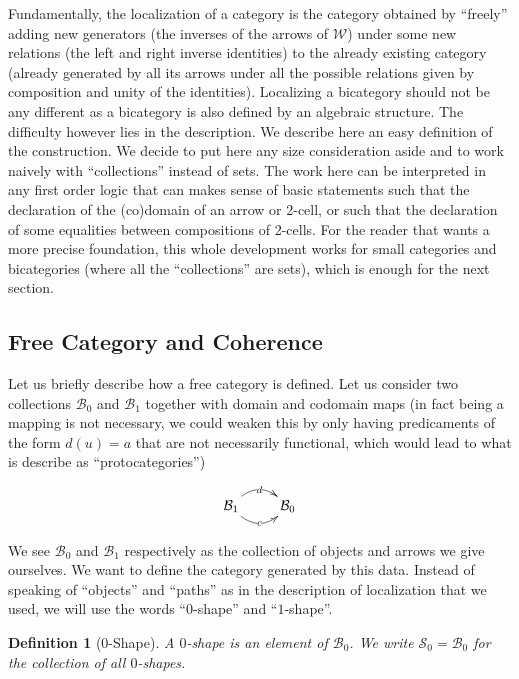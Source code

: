 \documentclass{article}
\numberwithin{equation}{section}
\theoremstyle{definition}
\theoremstyle{plain}
\newtheorem{definition}[equation]{Definition}
\begin{document}
Fundamentally, the localization of a category is the category obtained by ``freely'' adding new generators (the inverses of the arrows of $\mathcal{W}$) under some new relations (the left and right inverse identities) to the already existing category (already generated by all its arrows under all the possible relations given by composition and unity of the identities). Localizing a bicategory should not be any different as a bicategory is also defined by an algebraic structure. The difficulty however lies in the description. We describe here an easy definition of the construction. We decide to put here any size consideration aside and to work naively with ``collections'' instead of sets. The work here can be interpreted in any first order logic that can makes sense of basic statements such that the declaration of the (co)domain of an arrow or 2-cell, or such that the declaration of some equalities between compositions of 2-cells. For the reader that wants a more precise foundation, this whole development works for small categories and bicategories (where all the ``collections'' are sets), which is enough for the next section.

\subsection{Free Category and Coherence}

Let us briefly describe how a free category is defined. Let us consider two collections $\mathcal{B}_0$ and $\mathcal{B}_1$ together with domain and codomain maps (in fact being a mapping is not necessary, we could weaken this by only having predicaments of the form $d(u) = a$ that are not necessarily functional, which would lead to what is describe as ``protocategories'')

\[\xymatrix{\mathcal{B}_1 \ar@/^1pc/[r]|d \ar@/_1pc/[r]|c & \mathcal{B}_0 }\]

We see $\mathcal{B}_0$ and $\mathcal{B}_1$ respectively as the collection of objects and arrows we give ourselves. We want to define the category generated by this data. Instead of speaking of ``objects'' and ``paths'' as in the description of localization that we used, we will use the words ``$0$-shape'' and ``$1$-shape''.

\begin{definition}[$0$-Shape] A $0$-shape is an element of $\mathcal{B}_0$. We write $\mathcal{S}_0 = \mathcal{B}_0$ for the collection of all $0$-shapes.
\end{definition}
\end{document}
